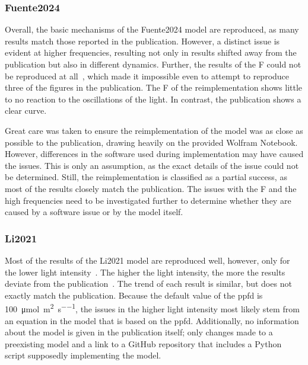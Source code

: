 \subsubsection{Fuente2024}

Overall, the basic mechanisms of the Fuente2024 model are reproduced, as many results match those reported in the publication. However, a distinct issue is evident at higher frequencies, resulting not only in results shifted away from the publication but also in different dynamics. Further, the results of the \gls{F} could not be reproduced at all~, which made it impossible even to attempt to reproduce three of the figures in the publication. The \gls{F} of the reimplementation shows little to no reaction to the oscillations of the light. In contrast, the publication shows a clear curve.

Great care was taken to ensure the reimplementation of the model was as close as possible to the publication, drawing heavily on the provided Wolfram Notebook. However, differences in the software used during implementation may have caused the issues. This is only an assumption, as the exact details of the issue could not be determined. Still, the reimplementation is classified as a partial success, as most of the results closely match the publication. The issues with the \gls{F} and the high frequencies need to be investigated further to determine whether they are caused by a software issue or by the model itself.

\subsubsection{Li2021}

Most of the results of the Li2021 model are reproduced well, however, only for the lower light intensity~. The higher the light intensity, the more the results deviate from the publication~. The trend of each result is similar, but does not exactly match the publication. Because the default value of the \gls{ppfd} is \qty{100}{\micro\mol\per\meter\squared\per\second}, the issues in the higher light intensity most likely stem from an equation in the model that is based on the \gls{ppfd}. Additionally, no information about the model is given in the publication itself; only changes made to a preexisting model and a link to a GitHub repository that includes a Python script supposedly implementing the model.


